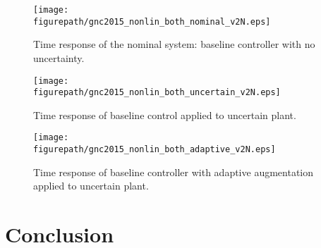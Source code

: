 \documentclass[]{../sty/JGCD}
\newcommand{\figurepath}{../fig}
\theoremstyle{examplestyle}
\begin{document}
  \begin{figure}[H]
    \begin{center}
      \texttt{[image: \\figurepath/gnc2015\_nonlin\_both\_nominal\_v2N.eps]}
      \vspace{-0.1in}
      \caption{Time response of the nominal system: baseline controller with no uncertainty.\label{fig.nominal}}
    \end{center}
  \end{figure}

  \begin{figure}[H]
    \begin{center}
      \texttt{[image: \\figurepath/gnc2015\_nonlin\_both\_uncertain\_v2N.eps]}
      \vspace{-0.1in}
      \caption{Time response of baseline control applied to uncertain plant.\label{fig.baselineuncertain}}
    \end{center}
  \end{figure}

  \begin{figure}[H]
    \begin{center}
      \texttt{[image: \\figurepath/gnc2015\_nonlin\_both\_adaptive\_v2N.eps]}
      \vspace{-0.1in}
      \caption{Time response of baseline controller with adaptive augmentation applied to uncertain plant.\label{fig.adaptive}}
    \end{center}
  \end{figure}

  \section{Conclusion}
\end{document}
